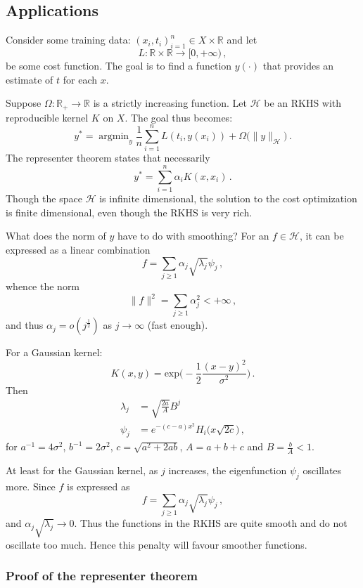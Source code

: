 \documentclass[a4paper]{article}
\newcommand{\Real}{\mathbb{R}}
\newcommand{\Hcal}{\mathcal{H}}
\newcommand{\argmin}{\mathop{\text{argmin}}}
\begin{document}

\subsection{Applications} %
\label{sub:applications}

Consider some training data: $(x_i, t_i)_{i=1}^n \in X\times \Real$ and let
\[L : \Real \times \Real \to [0,+\infty)\,,\]
be some cost function.
The goal is to find a function $y(\cdot)$ that provides an estimate of $t$ for
each $x$.

Suppose $\Omega:\Real_+\to\Real$ is a strictly increasing function. Let $\Hcal$
be an RKHS with reproducible kernel $K$ on $X$. The goal thus becomes:
\[ y^* = \argmin_y \frac{1}{n} \sum_{i=1}^n L(t_i,y(x_i)) + \Omega \bigl( \|y\|_{\Hcal} \bigr)\,. \]
The representer theorem states that necessarily
\[ y^* = \sum_{i=1}^n \alpha_i K(x,x_i)\,. \]
Though the space $\Hcal$ is infinite dimensional, the solution to the cost optimization
is finite dimensional, even though the RKHS is very rich.

What does the norm of $y$ have to do with smoothing? For an $f\in \Hcal$, it can
be expressed as a linear combination 
\[f = \sum_{j\geq1} \alpha_j \sqrt{\lambda_j}\psi_j\,,\]
whence the norm
\[ \|f\|^2 = \sum_{j\geq1} \alpha_j^2 < +\infty\,,\]
and thus $\alpha_j = o(j^{\tfrac{1}{2}})$ as $j\to \infty$ (fast enough).

For a Gaussian kernel: 
\[K(x,y) = \text{exp}\bigl( -\frac{1}{2} \frac{(x-y)^2}{\sigma^2}\bigr) \,. \]
Then \begin{align*}
	\lambda_j &= \sqrt{\frac{2a}{A}} B^j\\
	\psi_j &= e^{-(c-a) x^2} H_i\bigl(x\sqrt{2c}\bigr)\,,
\end{align*}
for $a^{-1} = 4\sigma^2$, $b^{-1} = 2\sigma^2$, $c = \sqrt{ a^2 + 2ab }$,
$A = a+ b+c$ and $B = \tfrac{b}{A} < 1$. 

At least for the Gaussian kernel, as $j$ increases, the eigenfunction $\psi_j$ oscillates
more. Since $f$ is expressed as
\[ f = \sum_{j\geq1} \alpha_j \sqrt{\lambda_j} \psi_j\,, \]
and $\alpha_j \sqrt{\lambda_j} \to 0$. Thus the functions in the RKHS are quite
smooth and do not oscillate too much. Hence this penalty will favour smoother functions.

\subsubsection{Proof of the representer theorem} %
\label{ssub:proof_of_the_representer_theorem}
\end{document}
